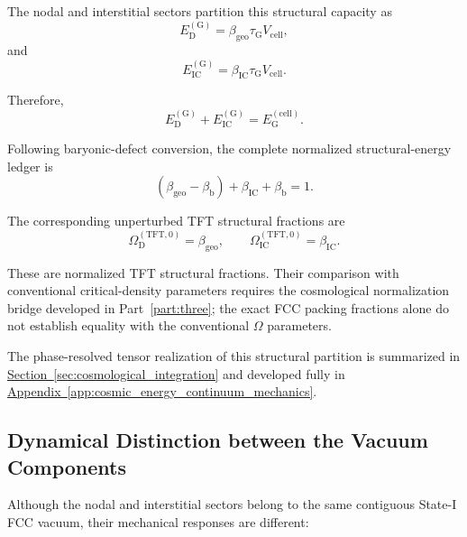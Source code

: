 The nodal and interstitial sectors partition this structural capacity as
\begin{equation}
    E_{\mathrm{D}}^{(\mathrm{G})} = \beta_{\mathrm{geo}} \tau_{\mathrm{G}} V_{\mathrm{cell}},
\end{equation}
and
\begin{equation}
    E_{\mathrm{IC}}^{(\mathrm{G})} = \beta_{\mathrm{IC}} \tau_{\mathrm{G}} V_{\mathrm{cell}}.
\end{equation}

Therefore,
\begin{equation}
    E_{\mathrm{D}}^{(\mathrm{G})} + E_{\mathrm{IC}}^{(\mathrm{G})} = E_{\mathrm{G}}^{(\mathrm{cell})}.
\end{equation}

Following baryonic-defect conversion, the complete normalized structural-energy ledger is
\begin{equation}
    \left( \beta_{\mathrm{geo}} - \beta_{\mathrm{b}} \right) + \beta_{\mathrm{IC}} + \beta_{\mathrm{b}} = 1.
\end{equation}

The corresponding unperturbed TFT structural fractions are
\begin{equation}
    \Omega_{\mathrm{D}}^{(\mathrm{TFT},0)} = \beta_{\mathrm{geo}}, \qquad \Omega_{\mathrm{IC}}^{(\mathrm{TFT},0)} = \beta_{\mathrm{IC}}.
\end{equation}

These are normalized TFT structural fractions. Their comparison with conventional critical-density parameters requires the cosmological normalization bridge developed in Part~\ref{part:three}; the exact FCC packing fractions alone do not establish equality with the conventional $\Omega$ parameters.

The phase-resolved tensor realization of this structural partition is summarized in \hyperref[sec:cosmological_integration]{Section~\ref*{sec:cosmological_integration}} and developed fully in \hyperref[app:cosmic_energy_continuum_mechanics]{Appendix~\ref*{app:cosmic_energy_continuum_mechanics}}.

\subsection{Dynamical Distinction between the Vacuum Components}

Although the nodal and interstitial sectors belong to the same contiguous State-I FCC vacuum, their mechanical responses are different:

